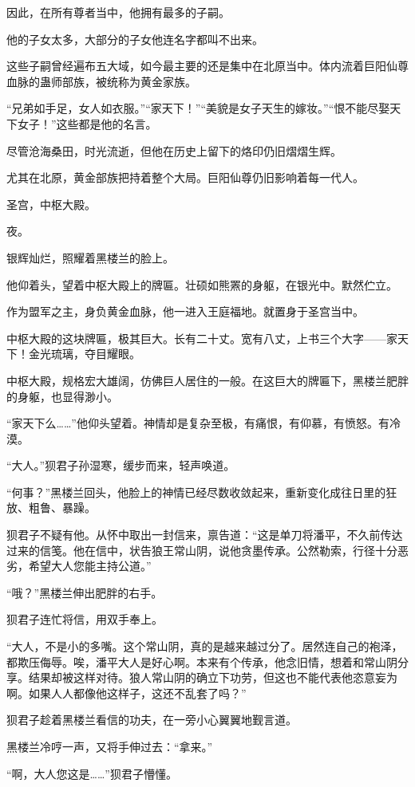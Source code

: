 \begin{this_body}
因此，在所有尊者当中，他拥有最多的子嗣。

他的子女太多，大部分的子女他连名字都叫不出来。

这些子嗣曾经遍布五大域，如今最主要的还是集中在北原当中。体内流着巨阳仙尊血脉的蛊师部族，被统称为黄金家族。

“兄弟如手足，女人如衣服。”“家天下！”“美貌是女子天生的嫁妆。”“恨不能尽娶天下女子！”这些都是他的名言。

尽管沧海桑田，时光流逝，但他在历史上留下的烙印仍旧熠熠生辉。

尤其在北原，黄金部族把持着整个大局。巨阳仙尊仍旧影响着每一代人。

圣宫，中枢大殿。

夜。

银辉灿烂，照耀着黑楼兰的脸上。

他仰着头，望着中枢大殿上的牌匾。壮硕如熊罴的身躯，在银光中。默然伫立。

作为盟军之主，身负黄金血脉，他一进入王庭福地。就置身于圣宫当中。

中枢大殿的这块牌匾，极其巨大。长有二十丈。宽有八丈，上书三个大字——家天下！金光琉璃，夺目耀眼。

中枢大殿，规格宏大雄阔，仿佛巨人居住的一般。在这巨大的牌匾下，黑楼兰肥胖的身躯，也显得渺小。

“家天下么……”他仰头望着。神情却是复杂至极，有痛恨，有仰慕，有愤怒。有冷漠。

“大人。”狈君子孙湿寒，缓步而来，轻声唤道。

“何事？”黑楼兰回头，他脸上的神情已经尽数收敛起来，重新变化成往日里的狂放、粗鲁、暴躁。

狈君子不疑有他。从怀中取出一封信来，禀告道：“这是单刀将潘平，不久前传达过来的信笺。他在信中，状告狼王常山阴，说他贪墨传承。公然勒索，行径十分恶劣，希望大人您能主持公道。”

“哦？”黑楼兰伸出肥胖的右手。

狈君子连忙将信，用双手奉上。

“大人，不是小的多嘴。这个常山阴，真的是越来越过分了。居然连自己的袍泽，都欺压侮辱。唉，潘平大人是好心啊。本来有个传承，他念旧情，想着和常山阴分享。结果却被这样对待。狼人常山阴的确立下功劳，但这也不能代表他恣意妄为啊。如果人人都像他这样子，这还不乱套了吗？”

狈君子趁着黑楼兰看信的功夫，在一旁小心翼翼地觐言道。

黑楼兰冷哼一声，又将手伸过去：“拿来。”

“啊，大人您这是……”狈君子懵懂。


\end{this_body}

